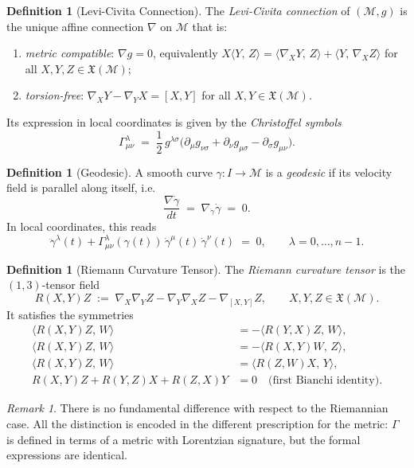 \documentclass[12pt, a4paper]{article}
\theoremstyle{plain}
\theoremstyle{definition}
\newtheorem{definition}[theorem]{Definition}
\theoremstyle{remark}
\newtheorem{remark}[theorem]{Remark}
\newcommand{\M}{\mathcal{M}}
\newcommand{\ls}[2]{\langle #1,\, #2 \rangle}
\begin{document}
\begin{definition}[Levi-Civita Connection]
  The \emph{Levi-Civita connection} of $(\M, g)$ is the unique affine
  connection $\nabla$ on $\M$ that is:
  \begin{enumerate}
    \item \emph{metric compatible}: $\nabla g = 0$, equivalently
          $X\ls{Y}{Z} = \ls{\nabla_X Y}{Z} + \ls{Y}{\nabla_X Z}$
          for all $X, Y, Z \in \mathfrak{X}(\M)$;
    \item \emph{torsion-free}: $\nabla_X Y - \nabla_Y X = [X, Y]$
          for all $X, Y \in \mathfrak{X}(\M)$.
  \end{enumerate}
  Its expression in local coordinates is given by the
  \emph{Christoffel symbols}
  \[
    \Gamma^\lambda_{\mu\nu}
    \;=\; \frac{1}{2}\, g^{\lambda\sigma}
          \bigl(\partial_\mu g_{\nu\sigma}
               + \partial_\nu g_{\mu\sigma}
               - \partial_\sigma g_{\mu\nu}\bigr).
  \]
\end{definition}

\begin{definition}[Geodesic]
\label{def:geodesic}
  A smooth curve $\gamma \colon I \to \M$ is a \emph{geodesic} if its
  velocity field is parallel along itself, i.e.\
  \[
    \frac{\nabla \dot{\gamma}}{dt} \;=\; \nabla_{\dot{\gamma}}\dot{\gamma} \;=\; 0.
  \]
  In local coordinates, this reads
  \[
    \ddot{\gamma}^\lambda(t)
    + \Gamma^\lambda_{\mu\nu}(\gamma(t))\,\dot{\gamma}^\mu(t)\,\dot{\gamma}^\nu(t)
    \;=\; 0, \qquad \lambda = 0, \ldots, n-1.
  \]
\end{definition}

\begin{definition}[Riemann Curvature Tensor]
  The \emph{Riemann curvature tensor} is the $(1,3)$-tensor field
  \[
    R(X,Y)Z \;:=\; \nabla_X\nabla_Y Z
                  - \nabla_Y\nabla_X Z
                  - \nabla_{[X,Y]}Z,
    \qquad X,Y,Z \in \mathfrak{X}(\M).
  \]
  It satisfies the symmetries
  \begin{align*}
    \ls{R(X,Y)Z}{W} &= -\ls{R(Y,X)Z}{W},\\
    \ls{R(X,Y)Z}{W} &= -\ls{R(X,Y)W}{Z},\\
    \ls{R(X,Y)Z}{W} &= \ls{R(Z,W)X}{Y},\\
    R(X,Y)Z + R(Y,Z)X + R(Z,X)Y &= 0
    \quad\text{(first Bianchi identity)}.
  \end{align*}
\end{definition}

\begin{remark}
  There is no fundamental difference with respect to the Riemannian case. All the distinction is encoded in the different prescription for the metric: $\Gamma$ is defined in terms of a metric with Lorentzian signature, but the formal expressions are identical.
\end{remark}
\end{document}
